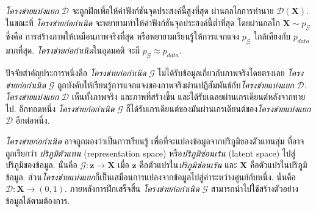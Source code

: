\textit{โครงข่ายแบ่งแยก} $\mathcal{D}$ จะถูกฝึกเพื่อให้ค่าฟังก์ชันจุดประสงค์นี้สูงที่สุด
ผ่านกลไกการทำนาย $\mathcal{D}(\bm{X})$.
ในขณะที่
\textit{โครงข่ายก่อกำเนิด} จะพยายามทำให้ค่าฟังก์ชันจุดประสงค์นี้ต่ำที่สุด
โดยผ่านกลไก $\bm{X} \sim p_{\mathcal{G}}$ 
ซึ่งคือ การสร้างภาพให้เหมือนภาพจริงที่สุด หรือพยายามเรียนรู้ให้การแจกแจง $p_{\mathcal{G}}$ ใกล้เคียงกับ $p_{data}$ มากที่สุด.
\textit{โครงข่ายก่อกำเนิด}ในอุดมคติ จะมี $p_{\mathcal{G}} \approx p_{data}$.

ปัจจัยสำคัญประการหนึ่งคือ \textit{โครงข่ายก่อกำเนิด} $\mathcal{G}$ ไม่ได้รับข้อมูลเกี่ยวกับภาพจริงโดยตรงเลย
\textit{โครงข่ายก่อกำเนิด} $\mathcal{G}$ ถูกบังคับให้เรียนรู้การแจกแจงของภาพจริงผ่านปฏิสัมพันธ์กับ\textit{โครงข่ายแบ่งแยก} $\mathcal{D}$.
\textit{โครงข่ายแบ่งแยก} $\mathcal{D}$ เห็นทั้งภาพจริง และภาพที่สร้างขึ้น และได้รับเฉลยผ่านเกรเดียนต์หลังจากทายไป.
อีกทอดหนึ่ง \textit{โครงข่ายก่อกำเนิด} $\mathcal{G}$ ก็ได้รับเกรเดียนต์ของมันผ่านเกรเดียนต์ของ\textit{โครงข่ายแบ่งแยก} $\mathcal{D}$ อีกต่อหนึ่ง.

\textit{โครงข่ายก่อกำเนิด} อาจถูกมองว่าเป็นการเรียนรู้ เพื่อที่จะแปลงข้อมูลจากปริภูมิของตัวแทนสุ่ม ที่อาจถูกเรียกว่า \textit{ปริภูมิตัวแทน} (representation space) หรือ\textit{ปริภูมิซ่อนเร้น} (latent space) ไปสู่ปริภูมิของข้อมูล.
นั่นคือ $\mathcal{G}: \bm{z} \rightarrow \bm{X}$ เมื่อ $\bm{z}$ คือตัวแปรใน\textit{ปริภูมิซ่อนเร้น}
และ $\bm{X}$ คือตัวแปรในปริภูมิข้อมูล.
ส่วน\textit{โครงข่ายแบ่งแยก}ก็เป็นเสมือนการแปลงจากข้อมูลไปสู่ค่าระหว่างศูนย์กับหนึ่ง.
นั่นคือ $\mathcal{D}: \bm{X} \rightarrow (0,1)$.
ภายหลังการฝึกเสร็จสิ้น 
\textit{โครงข่ายก่อกำเนิด} $\mathcal{G}$ สามารถนำไปใช้สร้างตัวอย่างข้อมูลได้ตามต้องการ.

